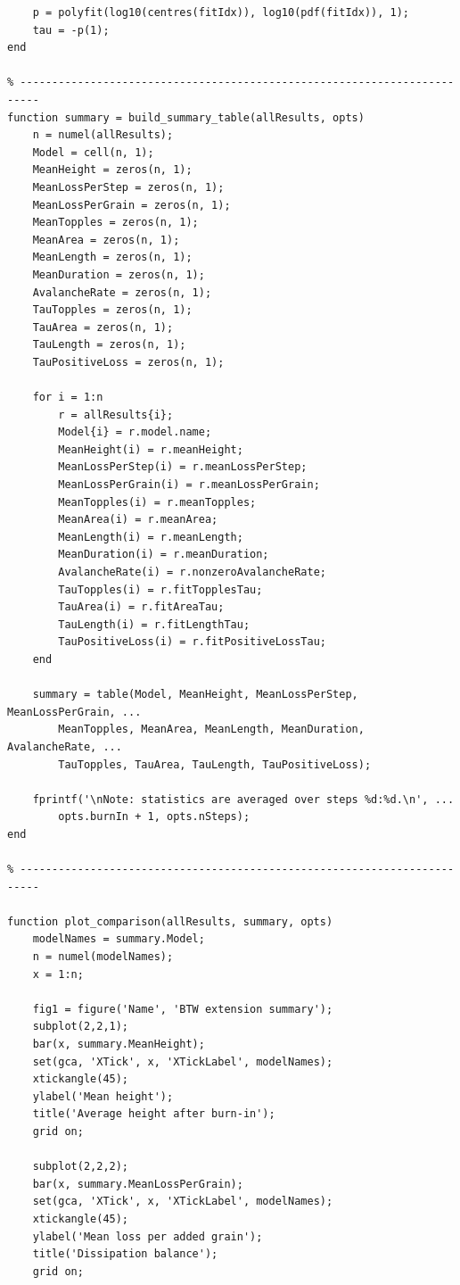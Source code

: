 \documentclass{article}
\begin{document}
\begin{lstlisting}
    p = polyfit(log10(centres(fitIdx)), log10(pdf(fitIdx)), 1);
    tau = -p(1);
end

% -------------------------------------------------------------------------
function summary = build_summary_table(allResults, opts)
    n = numel(allResults);
    Model = cell(n, 1);
    MeanHeight = zeros(n, 1);
    MeanLossPerStep = zeros(n, 1);
    MeanLossPerGrain = zeros(n, 1);
    MeanTopples = zeros(n, 1);
    MeanArea = zeros(n, 1);
    MeanLength = zeros(n, 1);
    MeanDuration = zeros(n, 1);
    AvalancheRate = zeros(n, 1);
    TauTopples = zeros(n, 1);
    TauArea = zeros(n, 1);
    TauLength = zeros(n, 1);
    TauPositiveLoss = zeros(n, 1);

    for i = 1:n
        r = allResults{i};
        Model{i} = r.model.name;
        MeanHeight(i) = r.meanHeight;
        MeanLossPerStep(i) = r.meanLossPerStep;
        MeanLossPerGrain(i) = r.meanLossPerGrain;
        MeanTopples(i) = r.meanTopples;
        MeanArea(i) = r.meanArea;
        MeanLength(i) = r.meanLength;
        MeanDuration(i) = r.meanDuration;
        AvalancheRate(i) = r.nonzeroAvalancheRate;
        TauTopples(i) = r.fitTopplesTau;
        TauArea(i) = r.fitAreaTau;
        TauLength(i) = r.fitLengthTau;
        TauPositiveLoss(i) = r.fitPositiveLossTau;
    end

    summary = table(Model, MeanHeight, MeanLossPerStep, MeanLossPerGrain, ...
        MeanTopples, MeanArea, MeanLength, MeanDuration, AvalancheRate, ...
        TauTopples, TauArea, TauLength, TauPositiveLoss);

    fprintf('\nNote: statistics are averaged over steps %d:%d.\n', ...
        opts.burnIn + 1, opts.nSteps);
end

% -------------------------------------------------------------------------

function plot_comparison(allResults, summary, opts)
    modelNames = summary.Model;
    n = numel(modelNames);
    x = 1:n;

    fig1 = figure('Name', 'BTW extension summary');
    subplot(2,2,1);
    bar(x, summary.MeanHeight);
    set(gca, 'XTick', x, 'XTickLabel', modelNames);
    xtickangle(45);
    ylabel('Mean height');
    title('Average height after burn-in');
    grid on;

    subplot(2,2,2);
    bar(x, summary.MeanLossPerGrain);
    set(gca, 'XTick', x, 'XTickLabel', modelNames);
    xtickangle(45);
    ylabel('Mean loss per added grain');
    title('Dissipation balance');
    grid on;


\end{lstlisting}
\end{document}
